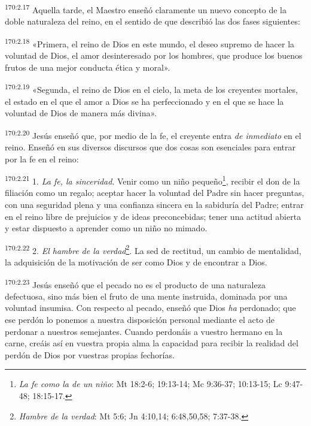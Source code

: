 \par 
\textsuperscript{170:2.17} Aquella tarde, el Maestro enseñó claramente un nuevo concepto de la doble naturaleza del reino, en el sentido de que describió las dos fases siguientes:

\par 
\textsuperscript{170:2.18} «Primera, el reino de Dios en este mundo, el deseo supremo de hacer la voluntad de Dios, el amor desinteresado por los hombres, que produce los buenos frutos de una mejor conducta ética y moral».

\par 
\textsuperscript{170:2.19} «Segunda, el reino de Dios en el cielo, la meta de los creyentes mortales, el estado en el que el amor a Dios se ha perfeccionado y en el que se hace la voluntad de Dios de manera más divina».

\par 
\textsuperscript{170:2.20} Jesús enseñó que, por medio de la fe, el creyente entra \textit{de inmediato} en el reino. Enseñó en sus diversos discursos que dos cosas son esenciales para entrar por la fe en el reino:

\par 
\textsuperscript{170:2.21} 1. \textit{La fe, la sinceridad}. Venir como un niño pequeño\footnote{\textit{La fe como la de un niño}: Mt 18:2-6; 19:13-14; Mc 9:36-37; 10:13-15; Lc 9:47-48; 18:15-17.}, recibir el don de la filiación como un regalo; aceptar hacer la voluntad del Padre sin hacer preguntas, con una seguridad plena y una confianza sincera en la sabiduría del Padre; entrar en el reino libre de prejuicios y de ideas preconcebidas; tener una actitud abierta y estar dispuesto a aprender como un niño no mimado.

\par 
\textsuperscript{170:2.22} 2. \textit{El hambre de la verdad}\footnote{\textit{Hambre de la verdad}: Mt 5:6; Jn 4:10,14; 6:48,50,58; 7:37-38.}. La sed de rectitud, un cambio de mentalidad, la adquisición de la motivación de ser como Dios y de encontrar a Dios.

\par 
\textsuperscript{170:2.23} Jesús enseñó que el pecado no es el producto de una naturaleza defectuosa, sino más bien el fruto de una mente instruida, dominada por una voluntad insumisa. Con respecto al pecado, enseñó que Dios \textit{ha} perdonado; que ese perdón lo ponemos a nuestra disposición personal mediante el acto de perdonar a nuestros semejantes. Cuando perdonáis a vuestro hermano en la carne, creáis así en vuestra propia alma la capacidad para recibir la realidad del perdón de Dios por vuestras propias fechorías.


